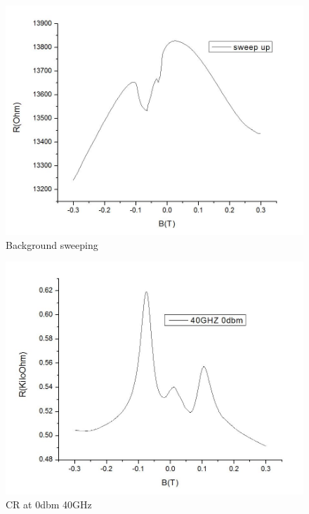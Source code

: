 \documentclass[12pt]{ruthesis}
\begin{document}
 
\begin{figure}
  \centering
  \includegraphics[totalheight=8cm]{figures/R(B)UP.JPG}
  \caption{Background sweeping}
  \label{r(b)}
\end{figure}

\begin{figure}
  \centering
  \includegraphics[totalheight=8cm]{figures/0dbm.JPG}
  \caption{CR at 0dbm 40GHz}
  \label{0dbm_40ghz}
\end{figure}
 
\end{document}
